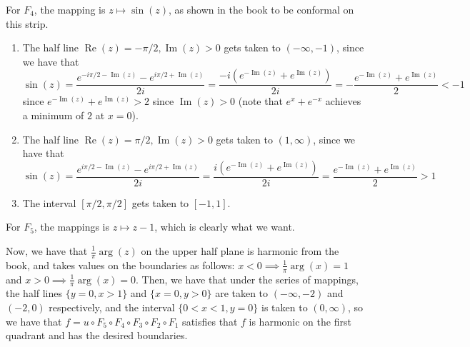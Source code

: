 \documentclass[12pt,letterpaper]{article}
\theoremstyle{definition}
\DeclareMathOperator{\real}{Re}
\DeclareMathOperator{\imag}{Im}
\begin{document}
For $F_{4}$, the mapping is $z \mapsto \sin(z)$, as shown in the book to be conformal on this strip.
\begin{enumerate}
  \item The half line $\real(z) = -\pi/2, \imag(z) > 0$ gets taken to $(-\infty, -1)$, since we have that
        \[
          \sin(z) = \frac{e^{-i\pi/2 - \imag(z)} - e^{i\pi/2 + \imag(z)}}{2i} = \frac{-i(e^{-\imag(z)}+e^{\imag(z)})}{2i} = -\frac{e^{-\imag(z)}+e^{\imag(z)}}{2} < -1
        \]
        since $e^{-\imag(z)} + e^{\imag(z)} > 2$ since $\imag(z) > 0$ (note that $e^{x} + e^{-x}$ achieves a minimum of $2$ at $x = 0$).
  \item The half line $\real(z) = \pi/2, \imag(z) > 0$ gets taken to $(1, \infty)$, since we have that
        \[
          \sin(z) = \frac{e^{i\pi/2 - \imag(z)} - e^{i\pi/2 + \imag(z)}}{2i} = \frac{i(e^{-\imag(z)}+e^{\imag(z)})}{2i} = \frac{e^{-\imag(z)}+e^{\imag(z)}}{2} > 1
        \]
  \item The interval $[\pi/2, \pi/2]$ gets taken to $[-1, 1]$.
\end{enumerate}

For $F_{5}$, the mappings is $z \mapsto z - 1$, which is clearly what we want.

Now, we have that $\frac{1}{\pi}\arg(z)$ on the upper half plane is harmonic from the book, and takes values on the boundaries as follows: $x < 0 \implies \frac{1}{\pi}\arg(x) = 1$ and $x > 0 \implies \frac{1}{\pi}\arg(x) = 0$. Then, we have that under the series of mappings, the half lines $\{y = 0, x > 1\}$ and $\{x = 0, y > 0\}$ are taken to $(-\infty, -2)$ and $(-2, 0)$ respectively, and the interval $\{0 < x < 1, y = 0\}$ is taken to $(0, \infty)$, so we have that $f = u \circ F_{5} \circ F_{4} \circ F_{3} \circ F_{2} \circ F_{1}$ satisfies that $f$ is harmonic on the first quadrant and has the desired boundaries.
\end{document}

